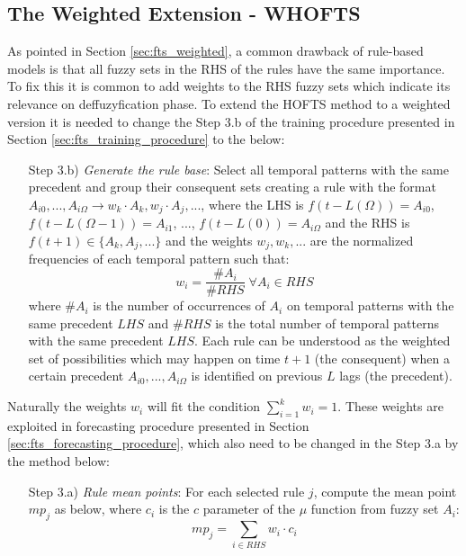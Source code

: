 \subsection{The Weighted Extension - WHOFTS}
\label{sec:fts_whofts}

As pointed in Section \ref{sec:fts_weighted}, a common drawback of rule-based models is that all fuzzy sets in the RHS of the rules have the same importance. To fix this it is common to add weights to the RHS fuzzy sets which indicate its relevance on deffuzyfication phase. To extend the HOFTS method to a weighted version it is needed to change the Step 3.b of the training procedure presented in Section \ref{sec:fts_training_procedure} to the below:

\begin{enumerate}
\item[Step 3.b)] \textit{Generate the rule base}: Select all temporal patterns with the same precedent and group their consequent sets  creating a rule with the format $A_{i0},...,A_{i\Omega} \rightarrow w_k \cdot A_k, w_j \cdot A_j,...$, where the LHS is $f(t - L(\Omega)) = A_{i0}$, $f(t - L(\Omega-1)) = A_{i1}$, ..., $f(t - L(0)) = A_{i\Omega}$ and the RHS is $f(t+1) \in \{A_k, A_j,...\}$ and the weights $w_j, w_k, ...$ are the normalized frequencies of each temporal pattern such that:
\begin{equation}
w_i = \frac{\#A_i}{\#RHS}\; \forall A_i \in RHS    
\end{equation}
where $\#A_i$ is the number of occurrences of $A_i$ on temporal patterns with the same precedent $LHS$ and $\#RHS$ is the total number of temporal patterns with the same precedent $LHS$. Each rule can be understood as the weighted set of possibilities which may happen on time $t+1$ (the consequent) when a certain precedent $A_{i0},...,A_{i\Omega}$ is identified on previous $L$ lags (the precedent).
\end{enumerate}

Naturally the weights $w_i$ will fit the condition $\sum_{i=1}^k w_i = 1$. These weights are exploited in forecasting procedure presented in Section \ref{sec:fts_forecasting_procedure}, which also need to be changed in the Step 3.a by the method below:

\begin{enumerate}
\item [Step 3.a)] \textit{Rule mean points}: For each selected rule $j$, compute the mean point $mp_j$ as below, where $c_{i}$ is the $c$ parameter of the $\mu$ function from fuzzy set $A_i$:
\begin{equation}
mp_j = \sum_{i \in RHS} w_i \cdot c_i
\end{equation}
\end{enumerate}

